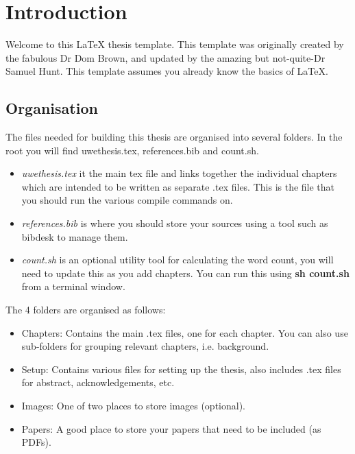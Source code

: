 \chapter{Introduction}\label{chap:intro}


Welcome to this \LaTeX{} thesis template. This template was originally created by the fabulous Dr Dom Brown, and updated by the amazing but not-quite-Dr Samuel Hunt. This template assumes you already know the basics of \LaTeX{}.



\section{Organisation}

The files needed for building this thesis are organised into several folders. In the root you will find uwethesis.tex, references.bib and count.sh. 

\begin{itemize}
\item \textit{uwethesis.tex} it the main tex file and links together the individual chapters which are intended to be written as separate .tex files. This is the file that you should run the various compile commands on.
\item \textit{references.bib} is where you should store your sources using a tool such as bibdesk to manage them. 
\item \textit{count.sh} is an optional utility tool for calculating the word count, you will need to update this as you add chapters. You can run this using \textbf{sh count.sh} from a terminal window. 
\end{itemize}



The 4 folders are organised as follows:


\begin{itemize}
\item Chapters: Contains the main .tex files, one for each chapter. You can also use sub-folders for grouping relevant chapters, i.e. background.
\item Setup: Contains various files for setting up the thesis, also includes .tex files for abstract, acknowledgements, etc.
\item Images: One of two places to store images (optional).
\item Papers: A good place to store your papers that need to be included (as PDFs).
\end{itemize}



